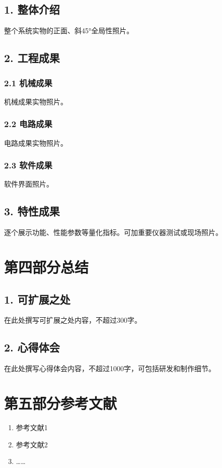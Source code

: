 \documentclass[12pt, a4paper]{article}
\begin{document}
\subsection*{1. 整体介绍}
整个系统实物的正面、斜45°全局性照片。

\subsection*{2. 工程成果}
\subsubsection*{2.1 机械成果}
机械成果实物照片。

\subsubsection*{2.2 电路成果}
电路成果实物照片。

\subsubsection*{2.3 软件成果}
软件界面照片。

\subsection*{3. 特性成果}
逐个展示功能、性能参数等量化指标。可加重要仪器测试或现场照片。

\section*{第四部分\quad 总结}

\subsection*{1. 可扩展之处}
在此处撰写可扩展之处内容，不超过300字。

\subsection*{2. 心得体会}
在此处撰写心得体会内容，不超过1000字，可包括研发和制作细节。

\section*{第五部分\quad 参考文献}
\begin{enumerate}[leftmargin=*]
    \item 参考文献1
    \item 参考文献2
    \item ……
\end{enumerate}
\end{document}
